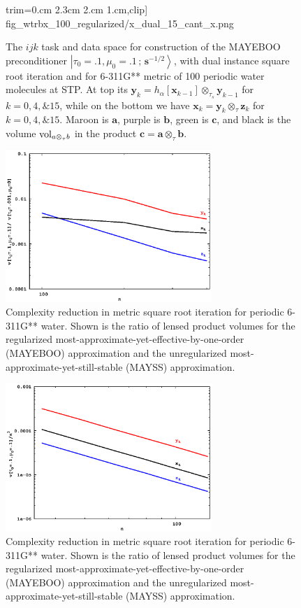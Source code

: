 \documentclass[letterpaper,twocolumn,amsmath,amsfont,amssymb,english,aps,jcp,preprintnumbers,groupaddress,nofootinbib,tightenlines,floatfix]{revtex4}
\newcommand{\mat}[1]{\boldsymbol{#1}}
\newcommand{\ot}{  {\scriptstyle \otimes}_{ \tau } }
\newcommand{\ots}{ {\scriptstyle \otimes}_{ \! \tau_s } }
\theoremstyle{plain}
\theoremstyle{remark}
\theoremstyle{plain}
\begin{document}
\begin{figure}[tb]
{                        trim={0.cm 2.3cm 2.cm 1.cm},clip]
                        {fig_wtrbx_100_regularized/x_dual_15_cant_x.png}} 
\caption{
The $ijk$ task and data space for construction of the MAYEBOO preconditioner 
$\left|\tau_0=.1,\mu_0=.1\, ; \,\scriptstyle{\mat{s}^{-1/2}} \right>$, with 
dual instance square root iteration  and for 6-311G** metric of 100 periodic water molecules
at STP.  At top its  $\mat{y}_k=h_\alpha[ \mat{x}_{k-1} ] \ots \mat{y}_{k-1}$
for $k=0,4,\& 15$, while on the bottom we have $\mat{x}_k=  \mat{y}_{k}  \ot \mat{z}_{k}$ for $k=0,4, \& 15$.
Maroon is $\mat{a}$, purple is $\mat{b}$, green is $\mat{c}$,  and black is the volume ${\rm vol}_{a \ot b}$
in the product $\mat{c}=\mat{a} \ot \mat{b}$.}\label{Lensing2}
\end{figure}

\begin{figure}[tb] 
\includegraphics[width=7.8cm,keepaspectratio=true,trim={0.cm 0.cm 0.cm 0.cm},clip]
                 {fig_regular_and_unleaded/pcnt_volume_water_boxes.eps} 
\caption{ 
Complexity reduction in metric square root iteration for periodic 6-311G** water. 
Shown is the ratio of lensed product volumes for the regularized most-approximate-yet-effective-by-one-order (MAYEBOO) 
approximation and the unregularized most-approximate-yet-still-stable (MAYSS) approximation.}\label{Complex1}
\end{figure}


\begin{figure}[tb] 
\includegraphics[width=7.8cm,keepaspectratio=true,trim={0.cm 0.cm 0.cm 0.cm},clip]
                 {fig_33_tube_cond_10_regularized/volume_vs_n3_tubes.eps} 
\caption{ 
Complexity reduction in metric square root iteration for periodic 6-311G** water. 
Shown is the ratio of lensed product volumes for the regularized most-approximate-yet-effective-by-one-order (MAYEBOO) 
approximation and the unregularized most-approximate-yet-still-stable (MAYSS) approximation.}\label{Complex2}
\end{figure}
\end{document}
